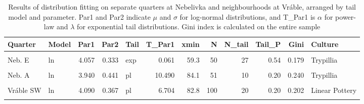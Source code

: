 \documentclass[
  12pt,
  a4paper, twoside]{book}
\begin{document}
\begin{landscape}\begin{table}

\caption[Distribution fitting results, quarters/neighbourhoods]{\label{tab:06-quart-tab}Results of distribution fitting on separate quarters at Nebelivka and neighbourhoods at Vráble, arranged by tail model and parameter. Par1 and Par2 indicate \(\mu\) and \(\sigma\) for log-normal distributions, and T\_Par1 is \(\alpha\) for power-law and \(\lambda\) for exponential tail distributions. Gini index is calculated on the entire sample}
\centering
\begin{tabular}[t]{llrrlrrrrrrl}
\toprule
Quarter & Model & Par1 & Par2 & Tail & T\_Par1 & xmin & N & N\_tail & Tail\_P & Gini & Culture\\
\midrule
\cellcolor{gray!6}{Neb. N} & \cellcolor{gray!6}{ln} & \cellcolor{gray!6}{3.830} & \cellcolor{gray!6}{0.408} & \cellcolor{gray!6}{exp} & \cellcolor{gray!6}{0.063} & \cellcolor{gray!6}{55.7} & \cellcolor{gray!6}{111} & \cellcolor{gray!6}{41} & \cellcolor{gray!6}{0.37} & \cellcolor{gray!6}{0.224} & \cellcolor{gray!6}{Trypillia}\\
Neb. E & ln & 4.057 & 0.333 & exp & 0.061 & 59.3 & 50 & 27 & 0.54 & 0.179 & Trypillia\\
\cellcolor{gray!6}{Vráble SE} & \cellcolor{gray!6}{ln} & \cellcolor{gray!6}{4.296} & \cellcolor{gray!6}{0.424} & \cellcolor{gray!6}{exp} & \cellcolor{gray!6}{0.034} & \cellcolor{gray!6}{84.4} & \cellcolor{gray!6}{89} & \cellcolor{gray!6}{37} & \cellcolor{gray!6}{0.42} & \cellcolor{gray!6}{0.236} & \cellcolor{gray!6}{Linear Pottery}\\
Neb. A & ln & 3.940 & 0.441 & pl & 10.490 & 84.1 & 51 & 10 & 0.20 & 0.240 & Trypillia\\
\cellcolor{gray!6}{Neb. G} & \cellcolor{gray!6}{ln} & \cellcolor{gray!6}{4.137} & \cellcolor{gray!6}{0.295} & \cellcolor{gray!6}{pl} & \cellcolor{gray!6}{6.763} & \cellcolor{gray!6}{67.5} & \cellcolor{gray!6}{141} & \cellcolor{gray!6}{60} & \cellcolor{gray!6}{0.43} & \cellcolor{gray!6}{0.160} & \cellcolor{gray!6}{Trypillia}\\
\addlinespace
Vráble SW & ln & 4.090 & 0.367 & pl & 6.704 & 82.8 & 100 & 20 & 0.20 & 0.202 & Linear Pottery\\
\cellcolor{gray!6}{Neb. D} & \cellcolor{gray!6}{ln} & \cellcolor{gray!6}{4.085} & \cellcolor{gray!6}{0.361} & \cellcolor{gray!6}{pl} & \cellcolor{gray!6}{5.684} & \cellcolor{gray!6}{68.5} & \cellcolor{gray!6}{104} & \cellcolor{gray!6}{38} & \cellcolor{gray!6}{0.37} & \cellcolor{gray!6}{0.196} & \cellcolor{gray!6}{Trypillia}\\

\end{tabular}
\end{table}
\end{landscape}
\end{document}
